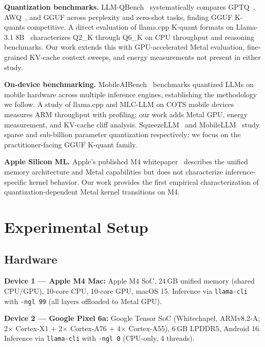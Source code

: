 \documentclass{article}
\begin{document}
\textbf{Quantization benchmarks.} LLM-QBench~\cite{llmqbench} systematically compares GPTQ~\cite{gptq}, AWQ~\cite{awq}, and GGUF across perplexity and zero-shot tasks, finding GGUF K-quants competitive. A direct evaluation of llama.cpp K-quant formats on Llama-3.1 8B~\cite{whichquant} characterizes Q2\_K through Q6\_K on CPU throughput and reasoning benchmarks. Our work extends this with GPU-accelerated Metal evaluation, fine-grained KV-cache context sweeps, and energy measurements not present in either study.

\textbf{On-device benchmarking.} MobileAIBench~\cite{mobileaibench} benchmarks quantized LLMs on mobile hardware across multiple inference engines, establishing the methodology we follow. A study of llama.cpp and MLC-LLM on COTS mobile devices~\cite{llminpockets} measures ARM throughput with profiling; our work adds Metal GPU, energy measurement, and KV-cache cliff analysis. SqueezeLLM~\cite{squeezellm} and MobileLLM~\cite{mobilellm} study sparse and sub-billion parameter quantization respectively; we focus on the practitioner-facing GGUF K-quant family.

\textbf{Apple Silicon ML.} Apple's published M4 whitepaper~\cite{applem4} describes the unified memory architecture and Metal capabilities but does not characterize inference-specific kernel behavior. Our work provides the first empirical characterization of quantization-dependent Metal kernel transitions on M4.

\section{Experimental Setup}
\label{sec:setup}

\subsection{Hardware}

\textbf{Device 1 — Apple M4 Mac:} Apple M4 SoC, 24\,GB unified memory (shared CPU/GPU), 10-core CPU, 10-core GPU, macOS 15. Inference via \texttt{llama-cli} with \texttt{-ngl~99} (all layers offloaded to Metal GPU).

\textbf{Device 2 — Google Pixel 6a:} Google Tensor SoC (Whitechapel, ARMv8.2-A; 2$\times$ Cortex-X1 + 2$\times$ Cortex-A76 + 4$\times$ Cortex-A55), 6\,GB LPDDR5, Android 16. Inference via \texttt{llama-cli} with \texttt{-ngl~0} (CPU-only, 4 threads).
\end{document}
